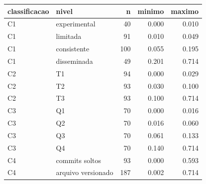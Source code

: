 \begin{tabular}{llrrr}
\toprule
classificacao & nivel & n & minimo & maximo \\
\midrule
C1 & experimental & 40 & 0.000 & 0.010 \\
C1 & limitada & 91 & 0.010 & 0.049 \\
C1 & consistente & 100 & 0.055 & 0.195 \\
C1 & disseminada & 49 & 0.201 & 0.714 \\
C2 & T1 & 94 & 0.000 & 0.029 \\
C2 & T2 & 93 & 0.030 & 0.100 \\
C2 & T3 & 93 & 0.100 & 0.714 \\
C3 & Q1 & 70 & 0.000 & 0.016 \\
C3 & Q2 & 70 & 0.016 & 0.060 \\
C3 & Q3 & 70 & 0.061 & 0.133 \\
C3 & Q4 & 70 & 0.140 & 0.714 \\
C4 & commits soltos & 93 & 0.000 & 0.593 \\
C4 & arquivo versionado & 187 & 0.002 & 0.714 \\
\bottomrule
\end{tabular}
